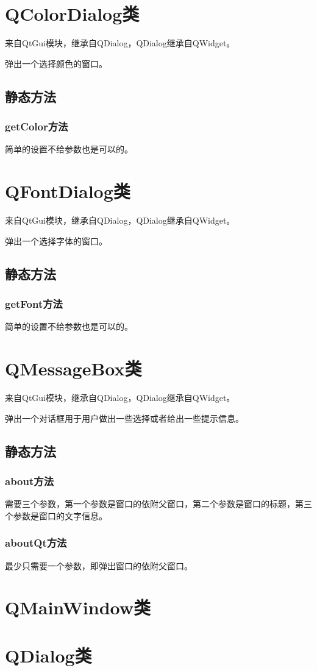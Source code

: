 \documentclass[12pt,oneside]{book}
\begin{document}
\begin{common-format}
\section{QColorDialog类}
来自QtGui模块，继承自QDialog，QDialog继承自QWidget。

弹出一个选择颜色的窗口。

\subsection{静态方法}
\subsubsection{getColor方法}
简单的设置不给参数也是可以的。

\section{QFontDialog类}
来自QtGui模块，继承自QDialog，QDialog继承自QWidget。

弹出一个选择字体的窗口。
\subsection{静态方法}
\subsubsection{getFont方法}
简单的设置不给参数也是可以的。


\section{QMessageBox类}
来自QtGui模块，继承自QDialog，QDialog继承自QWidget。

弹出一个对话框用于用户做出一些选择或者给出一些提示信息。

\subsection{静态方法}
\subsubsection{about方法}
需要三个参数，第一个参数是窗口的依附父窗口，第二个参数是窗口的标题，第三个参数是窗口的文字信息。

\subsubsection{aboutQt方法}
最少只需要一个参数，即弹出窗口的依附父窗口。


\section{QMainWindow类}



\section{QDialog类}









\end{common-format}
\end{document}
